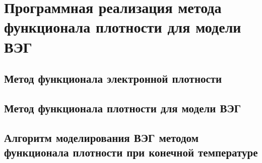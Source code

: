 
\chapter{Программная реализация метода функционала плотности для модели ВЭГ}

\section{Метод функционала электронной плотности}

\section{Метод функционала плотности для модели ВЭГ}

\section{Алгоритм моделирования ВЭГ методом функционала плотности при конечной температуре}
